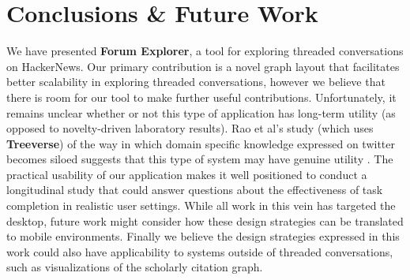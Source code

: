 \documentclass{egpubl}
\begin{document}
\section{Conclusions \& Future Work}
We have presented \textbf{Forum Explorer}, a tool for exploring threaded conversations on HackerNews. 
%
Our primary contribution is a novel graph layout that facilitates better scalability in exploring threaded conversations, however we believe that there is room for our tool to make further useful contributions.
%
Unfortunately, it remains unclear whether or not this type of application has long-term utility (as opposed to novelty-driven laboratory results).
%
%
%
Rao et al's study (which uses \textbf{Treeverse}) of the way in which domain specific knowledge expressed on twitter becomes siloed suggests that this type of system may have genuine utility \cite{twittercanoes}.
%
%
The practical usability of our application makes it well positioned to conduct a longitudinal study that could answer questions about the effectiveness of task completion in realistic user settings.
%
While all work in this vein has targeted the desktop, future work might consider how these design strategies can be translated to mobile environments.
%
Finally we believe the design strategies expressed in this work could also have applicability to systems outside of threaded conversations, such as visualizations of the scholarly citation graph.




\end{document}
